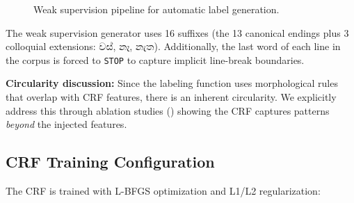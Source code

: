 \documentclass[12pt, a4paper, twoside]{report}
\begin{document}
\begin{figure}[htbp]
\centering
{}
\caption{Weak supervision pipeline for automatic label generation.}
\label{fig:weak-supervision}
\end{figure}

The weak supervision generator uses 16 suffixes (the 13 canonical endings plus 3 colloquial extensions: වස්, නෑ, නැත). Additionally, the last word of each line in the corpus is forced to \texttt{STOP} to capture implicit line-break boundaries.

\textbf{Circularity discussion:} Since the labeling function uses morphological rules that overlap with CRF features, there is an inherent circularity. We explicitly address this through ablation studies () showing the CRF captures patterns \textit{beyond} the injected features.

\subsection{CRF Training Configuration}

The CRF is trained with L-BFGS optimization and L1/L2 regularization:
\end{document}
